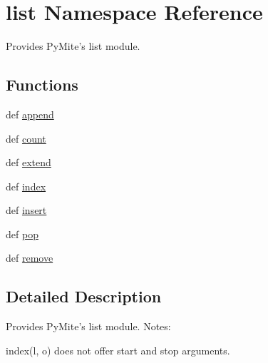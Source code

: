 \hypertarget{namespacelist}{\section{list Namespace Reference}
\label{namespacelist}
}


Provides Py\-Mite's list module.  


\subsection*{Functions}
\begin{DoxyCompactItemize}
\item 
def \hyperlink{namespacelist_af5fb3b7dbde16ada7dd1468cdee24726}{append}
\item 
def \hyperlink{namespacelist_a6f68e784976582e93cda71a7309a798e}{count}
\item 
def \hyperlink{namespacelist_abcde56d6c54c3c96055926b11270e460}{extend}
\item 
def \hyperlink{namespacelist_a075d0c9e6abd0e9dfd8384dbf1b887d2}{index}
\item 
def \hyperlink{namespacelist_a710e65b39b6283d5a8295189b5d9d625}{insert}
\item 
def \hyperlink{namespacelist_a17c5dcb887cba7adca7efa5be9ebce63}{pop}
\item 
def \hyperlink{namespacelist_a40bf167cbe7dc81d668ffebaa9ae0581}{remove}
\end{DoxyCompactItemize}


\subsection{Detailed Description}
Provides Py\-Mite's list module. Notes\-:
\begin{DoxyItemize}
\item index(l, o) does not offer start and stop arguments. 
\end{DoxyItemize}

